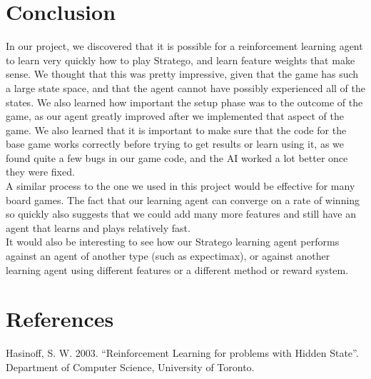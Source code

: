 \documentclass[letterpaper]{article}
\begin{document}

\section{Conclusion}
In our project, we discovered that it is possible for a reinforcement learning agent to learn very quickly how to play Stratego, and learn feature weights that make sense. We thought that this was pretty impressive, given that the game has such a large state space, and that the agent cannot have possibly experienced all of the states. We also learned how important the setup phase was to the outcome of the game, as our agent greatly improved after we implemented that aspect of the game. We also learned that it is important to make sure that the code for the base game works correctly before trying to get results or learn using it, as we found quite a few bugs in our game code, and the AI worked a lot better once they were fixed.
\\

A similar process to the one we used in this project would be effective for many board games. The fact that our learning agent can converge on a rate of winning so quickly also suggests that we could add many more features and still have an agent that learns and plays relatively fast.\\

It would also be interesting to see how our Stratego learning agent performs against an agent of another type (such as expectimax), or against another learning agent using different features or a different method or reward system.

\section{References}
Hasinoff, S. W. 2003. ``Reinforcement Learning for problems with Hidden State''. Department of Computer Science, University of Toronto.\\
\end{document}
